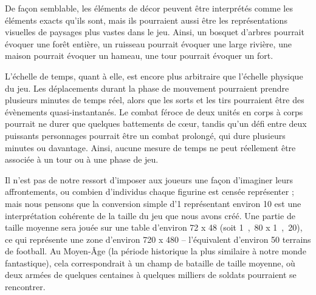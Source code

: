 De façon semblable, les éléments de décor peuvent être interprétés comme les éléments exacts qu’ils sont, mais ils pourraient aussi être les représentations visuelles de paysages plus vastes dans le jeu. Ainsi, un bosquet d’arbres pourrait évoquer une forêt entière, un ruisseau pourrait évoquer une large rivière, une maison pourrait évoquer un hameau, une tour pourrait évoquer un fort.

L’échelle de temps, quant à elle, est encore plus arbitraire que l’échelle physique du jeu. Les déplacements durant la phase de mouvement pourraient prendre plusieurs minutes de temps réel, alors que les sorts et les tirs pourraient être des évènements quasi-instantanés. Le combat féroce de deux unités en corps à corps pourrait ne durer que quelques battements de cœur, tandis qu’un défi entre deux puissants personnages pourrait être un combat prolongé, qui dure plusieurs minutes ou davantage. Ainsi, aucune mesure de temps ne peut réellement être associée à un tour ou à une phase de jeu.

Il n’est pas de notre ressort d’imposer aux joueurs une façon d’imaginer leurs affrontements, ou combien d’individus chaque figurine est censée représenter ; mais nous pensons que la conversion simple d’\unit{1}\pouce{} représentant environ \unit{10}\meter{} est une interprétation cohérente de la taille du jeu que nous avons créé. Une partie de taille moyenne sera jouée sur une table d’environ \unit{72}\pouce{} x \unit{48}\pouce{} (soit \unit{1,80}\meter{} x \unit{1,20}\meter{}), ce qui représente une zone d’environ \unit{720}\meter{} x \unit{480}\meter{} – l’équivalent d’environ 50 terrains de football. Au Moyen-Âge (la période historique la plus similaire à notre monde fantastique), cela correspondrait à un champ de bataille de taille moyenne, où deux armées de quelques centaines à quelques milliers de soldats pourraient se rencontrer.
